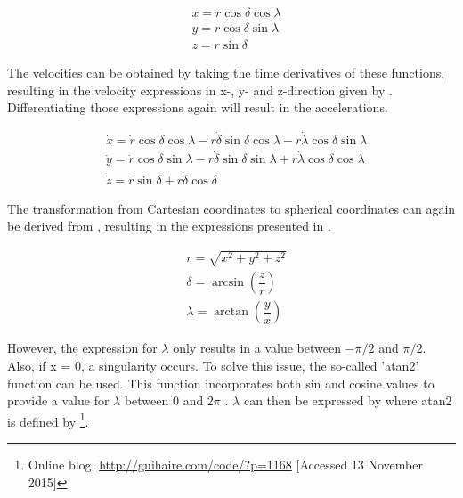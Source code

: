 
\begin{equation} \label{eq:sphertocartp}
\begin{split}
& x=r\cos\delta \cos\lambda \\
& y=r\cos\delta \sin\lambda \\
& z=r\sin\delta 
\end{split}
\end{equation}

The velocities can be obtained by taking the time derivatives of these functions, resulting in the velocity expressions in x-, y- and z-direction given by . Differentiating those expressions again will result in the accelerations.

\begin{equation} \label{eq:sphertocartv}
\begin{split}
& \dot{x}=\dot{r}\cos\delta \cos\lambda -r\dot{\delta}\sin\delta \cos\lambda -r\dot{\lambda}\cos\delta \sin\lambda \\
& \dot{y}=\dot{r}\cos\delta \sin\lambda -r\dot{\delta}\sin\delta \sin\lambda +r\dot{\lambda}\cos\delta \cos\lambda \\
& \dot{z}=\dot{r}\sin\delta +r\dot{\delta}\cos\delta 
\end{split}
\end{equation}

The transformation from Cartesian coordinates to spherical coordinates can again be derived from , resulting in the expressions presented in .

\begin{equation} \label{eq:carttospherp}
\begin{split}
& r=\sqrt{x^{2}+y^{2}+z^{2}}\\
& \delta=\arcsin\left(\dfrac{z}{r}\right)\\
& \lambda=\arctan\left(\dfrac{y}{x}\right)
\end{split}
\end{equation}

However, the expression for $\lambda$ only results in a value between $-\pi/2$ and $\pi/2$. Also, if x = 0, a singularity occurs. To solve this issue, the so-called 'atan2' function can be used. This function incorporates both sin and cosine values to provide a value for $\lambda$ between 0 and 2$\pi$ \citep{noomen2013basic}. $\lambda$ can then be expressed by  where atan2 is defined by \footnote{Online blog: \url{http://guihaire.com/code/?p=1168} [Accessed 13 November 2015]}.


